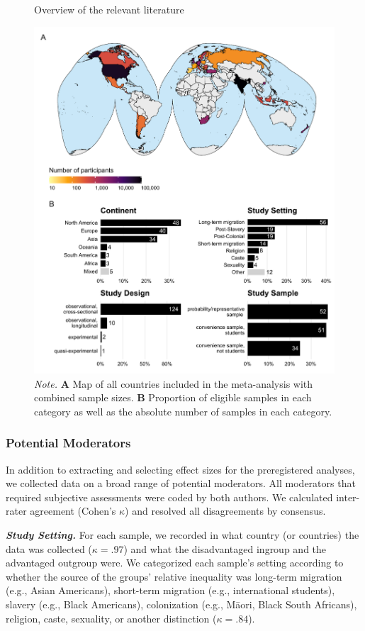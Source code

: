 \documentclass[twocolumn, 11pt, letterpaper]{article}
\begin{document}
\begin{figure}
\centering
\caption{Overview of the relevant literature}
\includegraphics[scale=1]{../figures/figure-2}
\caption*{\textit{Note.} \textbf{A} Map of all countries included in the meta-analysis with combined sample sizes. \textbf{B} Proportion of eligible samples in each category as well as the absolute number of samples in each category.}
\label{fig:f2}
\end{figure}

\hypertarget{potential-moderators}{%
\subsubsection{Potential Moderators}\label{potential-moderators}}

In addition to extracting and selecting effect sizes for the
preregistered analyses, we collected data on a broad range of potential
moderators. All moderators that required subjective assessments were
coded by both authors. We calculated inter-rater agreement (Cohen's
\(\kappa\)) and resolved all disagreements by consensus.

\textbf{\emph{Study Setting.}} For each sample, we recorded in what
country (or countries) the data was collected (\(\kappa = .97\)) and
what the disadvantaged ingroup and the advantaged outgroup were. We
categorized each sample's setting according to whether the source of the
groups' relative inequality was long-term migration (e.g., Asian
Americans), short-term migration (e.g., international students), slavery
(e.g., Black Americans), colonization (e.g., Māori, Black South
Africans), religion, caste, sexuality, or another distinction
(\(\kappa = .84\)).
\end{document}
